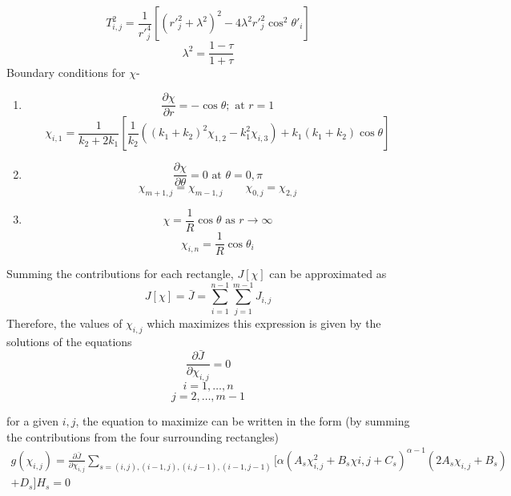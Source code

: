 \documentclass[a4paper]{report}
\begin{document}
	$$	
	T_{i,j}^2 = \frac{1}{r'^4_j}
	\left[
		(r'^2_j+\lambda^2)^2 - 4\lambda^2r'^2_j \cos^2 \theta '_i
	\right]	
	$$
	$$
	\lambda^2 = \frac{1-\tau}{1+\tau}
	$$
	Boundary conditions for $\chi$-
	\begin{enumerate}
	
	\item
	$$
	\frac{\partial \chi}{\partial r} = - \cos \theta; \text{ at } r=1
	$$
	\begin{equation}
	\chi_{i,1}=\frac{1}{k_2+2k_1}
	\left[
		\frac{1}{k_2}
		((k_1+k_2)^2\chi_{1,2} - k_1^2 \chi_{i,3})
		+ k_1(k_1+k_2)\cos \theta
	\right]
	\end{equation}
	
	\item $$ \frac{\partial \chi}{\partial \theta} = 0 \text{ at } \theta = 0, \pi $$
	\begin{equation}
	\chi_{m+1,j} = \chi_{m-1,j} \qquad 
	\chi_{0,j} = \chi_{2,j}
	\end{equation}
	
	\item $$ \chi = \frac{1}{R} \cos \theta \text{ as } r \rightarrow \infty $$
	\begin{equation}
	\chi_{i,n} = \frac{1}{R} \cos \theta_i
	\end{equation}
	
	\end{enumerate}
	
	Summing the contributions for each rectangle, $J[\chi]$ can be approximated as 
	\begin{equation}
	J[\chi] = \bar{J} = 
	\sum\limits_{i=1}^{n-1} \sum\limits_{j=1}^{m-1} J_{i,j}
	\end{equation}
	Therefore, the values of $\chi_{i,j}$ which maximizes this expression is given by the solutions of the equations
	\begin{equation}
	\frac{\partial \bar{J}}{\partial \chi_{i,j}} = 0
	\end{equation}
	$$ i = 1,\ldots,n $$
	$$ j = 2,\ldots,m-1 $$
	
	for a given $i,j$, the equation to maximize can be written in the form (by summing the contributions from the four surrounding rectangles)
	\begin{equation}
	\begin{split}
	g(\chi_{i,j}) = \frac{\partial \bar{J}}{\partial \chi_{i,j}} 
	\sum\limits_{s=(i,j),(i-1,j),(i,j-1),(i-1,j-1)}
	\Biggl[
		\alpha
		\left(
			A_s\chi^2_{i,j} + B_s\chi{i,j} + C_s
		\right)^{\alpha-1}
		\left(
			2A_s\chi_{i,j} + B_s
		\right) \\
		 + D_s
	\Biggr]H_s	
	= 0
	\end{split}
	\end{equation}
	
\end{document}
